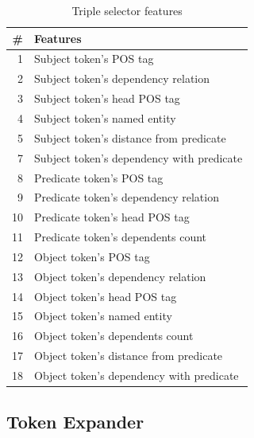 \documentclass[conference,compsoc]{IEEEtran}
\begin{document}
\lipsum[3-5]

\begin{table}[!t]
\renewcommand{\arraystretch}{1.5}
\caption{Triple selector features}
\label{table_models_features}
\centering
\begin{tabular}{r|l}
\hline
\textbf{\#} & \textbf{Features} \\
\hline
1 & Subject token's POS tag \\
2 & Subject token's dependency relation \\
3 & Subject token's head POS tag \\
4 & Subject token's named entity \\
5 & Subject token's distance from predicate \\
7 & Subject token's dependency with predicate \\
8 & Predicate token's POS tag \\
9 & Predicate token's dependency relation \\
10 & Predicate token's head POS tag \\
11 & Predicate token's dependents count \\
12 & Object token's POS tag \\
13 & Object token's dependency relation \\
14 & Object token's head POS tag \\
15 & Object token's named entity \\
16 & Object token's dependents count \\
17 & Object token's distance from predicate \\
18 & Object token's dependency with predicate \\
\end{tabular}
\end{table}


\subsection{Token Expander}


\lipsum[3-5]
\end{document}
